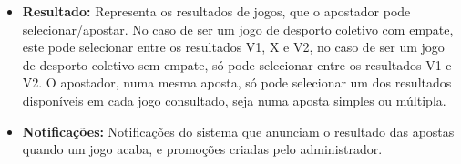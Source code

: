 \begin{itemize}
    \item \textbf{Resultado:} Representa os resultados de jogos, que o apostador pode selecionar/apostar. No caso de ser um jogo de desporto coletivo com empate, este pode selecionar entre os resultados V1, X e V2, no caso de ser um jogo de desporto coletivo sem empate, só pode selecionar entre os resultados V1 e V2. O apostador, numa mesma aposta, só pode selecionar um dos resultados disponíveis em cada jogo consultado, seja numa aposta simples ou múltipla. 
      
    \item \textbf{Notificações:} Notificações do sistema que anunciam o resultado das apostas quando um jogo acaba, e promoções criadas pelo administrador.
\end{itemize}